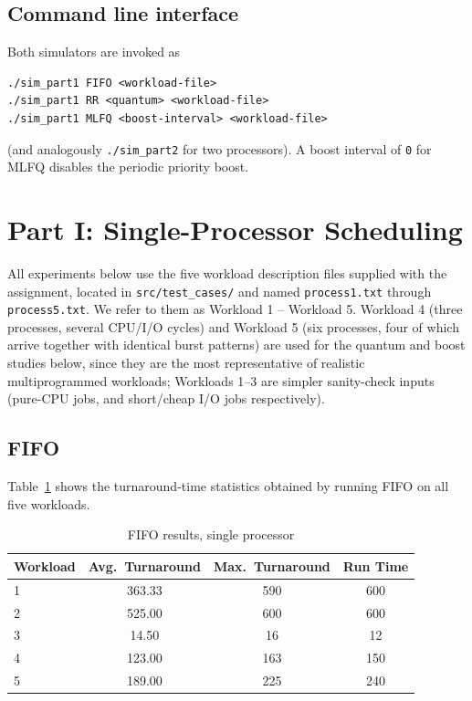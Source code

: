 \documentclass[11pt]{article}
\begin{document}
\subsection{Command line interface}
Both simulators are invoked as
\begin{lstlisting}
./sim_part1 FIFO <workload-file>
./sim_part1 RR <quantum> <workload-file>
./sim_part1 MLFQ <boost-interval> <workload-file>
\end{lstlisting}
(and analogously \texttt{./sim\_part2} for two processors). A boost interval
of \texttt{0} for MLFQ disables the periodic priority boost.

\section{Part I: Single-Processor Scheduling}

All experiments below use the five workload description files supplied with
the assignment, located in \texttt{src/test\_cases/} and named
\texttt{process1.txt} through \texttt{process5.txt}. We refer to them as
Workload 1 -- Workload 5. Workload
4 (three processes, several CPU/I/O cycles) and Workload 5 (six processes,
four of which arrive together with identical burst patterns) are used for
the quantum and boost studies below, since they are the most representative
of realistic multiprogrammed workloads; Workloads 1--3 are simpler
sanity-check inputs (pure-CPU jobs, and short/cheap I/O jobs respectively).

\subsection{FIFO}
Table~\ref{tab:fifo} shows the turnaround-time statistics obtained by running
FIFO on all five workloads.

\begin{table}[H]
\centering
\caption{FIFO results, single processor}
\label{tab:fifo}
\begin{tabular}{lccc}
\toprule
Workload & Avg.\ Turnaround & Max.\ Turnaround & Run Time \\
\midrule
1 & 363.33 & 590 & 600 \\
2 & 525.00 & 600 & 600 \\
3 &  14.50 &  16 &  12 \\
4 & 123.00 & 163 & 150 \\
5 & 189.00 & 225 & 240 \\
\bottomrule
\end{tabular}
\end{table}
\end{document}
